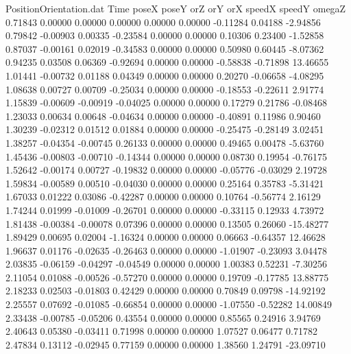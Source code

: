 \begin{filecontents}{PositionOrientation.dat}
Time poseX poseY orZ orY orX speedX speedY omegaZ
   0.71843    0.00000    0.00000     0.00000    0.00000    0.00000   -0.11284    0.04188   -2.94856
   0.79842   -0.00903    0.00335    -0.23584    0.00000    0.00000    0.10306    0.23400   -1.52858
   0.87037   -0.00161    0.02019    -0.34583    0.00000    0.00000    0.50980    0.60445   -8.07362
   0.94235    0.03508    0.06369    -0.92694    0.00000    0.00000   -0.58838   -0.71898   13.46655
   1.01441   -0.00732    0.01188     0.04349    0.00000    0.00000    0.20270   -0.06658   -4.08295
   1.08638    0.00727    0.00709    -0.25034    0.00000    0.00000   -0.18553   -0.22611    2.91774
   1.15839   -0.00609   -0.00919    -0.04025    0.00000    0.00000    0.17279    0.21786   -0.08468
   1.23033    0.00634    0.00648    -0.04634    0.00000    0.00000   -0.40891    0.11986    0.90460
   1.30239   -0.02312    0.01512     0.01884    0.00000    0.00000   -0.25475   -0.28149    3.02451
   1.38257   -0.04354   -0.00745     0.26133    0.00000    0.00000    0.49465    0.00478   -5.63760
   1.45436   -0.00803   -0.00710    -0.14344    0.00000    0.00000    0.08730    0.19954   -0.76175
   1.52642   -0.00174    0.00727    -0.19832    0.00000    0.00000   -0.05776   -0.03029    2.19728
   1.59834   -0.00589    0.00510    -0.04030    0.00000    0.00000    0.25164    0.35783   -5.31421
   1.67033    0.01222    0.03086    -0.42287    0.00000    0.00000    0.10764   -0.56774    2.16129
   1.74244    0.01999   -0.01009    -0.26701    0.00000    0.00000   -0.33115    0.12933    4.73972
   1.81438   -0.00384   -0.00078     0.07396    0.00000    0.00000    0.13505    0.26060  -15.48277
   1.89429    0.00695    0.02004    -1.16324    0.00000    0.00000    0.06663   -0.64357   12.46628
   1.96637    0.01176   -0.02635    -0.26463    0.00000    0.00000   -1.01907   -0.23093    3.04478
   2.03835   -0.06159   -0.04297    -0.04549    0.00000    0.00000    1.00383    0.52231   -7.30256
   2.11054    0.01088   -0.00526    -0.57270    0.00000    0.00000    0.19709   -0.17785   13.88775
   2.18233    0.02503   -0.01803     0.42429    0.00000    0.00000    0.70849    0.09798  -14.92192
   2.25557    0.07692   -0.01085    -0.66854    0.00000    0.00000   -1.07550   -0.52282   14.00849
   2.33438   -0.00785   -0.05206     0.43554    0.00000    0.00000    0.85565    0.24916    3.94769
   2.40643    0.05380   -0.03411     0.71998    0.00000    0.00000    1.07527    0.06477    0.71782
   2.47834    0.13112   -0.02945     0.77159    0.00000    0.00000    1.38560    1.24791  -23.09710

\end{filecontents}
